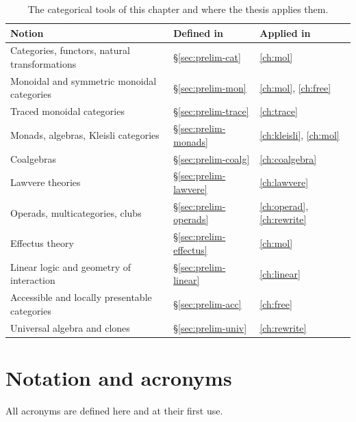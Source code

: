\begin{table}[htbp]
\centering
\small
\begin{tabular}{@{}lll@{}}
\toprule
Notion & Defined in & Applied in \\
\midrule
Categories, functors, natural transformations & \S\ref{sec:prelim-cat} & \autoref{ch:mol} \\
Monoidal and symmetric monoidal categories & \S\ref{sec:prelim-mon} & \autoref{ch:mol}, \autoref{ch:free} \\
Traced monoidal categories & \S\ref{sec:prelim-trace} & \autoref{ch:trace} \\
Monads, algebras, Kleisli categories & \S\ref{sec:prelim-monads} & \autoref{ch:kleisli}, \autoref{ch:mol} \\
Coalgebras & \S\ref{sec:prelim-coalg} & \autoref{ch:coalgebra} \\
Lawvere theories & \S\ref{sec:prelim-lawvere} & \autoref{ch:lawvere} \\
Operads, multicategories, clubs & \S\ref{sec:prelim-operads} & \autoref{ch:operad}, \autoref{ch:rewrite} \\
Effectus theory & \S\ref{sec:prelim-effectus} & \autoref{ch:mol} \\
Linear logic and geometry of interaction & \S\ref{sec:prelim-linear} & \autoref{ch:linear} \\
Accessible and locally presentable categories & \S\ref{sec:prelim-acc} & \autoref{ch:free} \\
Universal algebra and clones & \S\ref{sec:prelim-univ} & \autoref{ch:rewrite} \\
\bottomrule
\end{tabular}
\caption{The categorical tools of this chapter and where the thesis applies them.}
\end{table}


\section{Notation and acronyms}\label{sec:prelim-notation}

All acronyms are defined here and at their first use.

